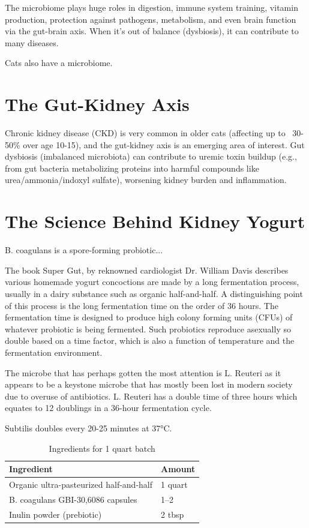 \documentclass[twocolumn]{NobArticle}
\begin{document}
	The microbiome plays huge roles in digestion, immune system training, vitamin production, protection against pathogens, metabolism, and even brain function via the gut-brain axis. When it's out of balance (dysbiosis), it can contribute to many diseases.
	
	Cats also have a microbiome.
	
	\section{The Gut-Kidney Axis}
	Chronic kidney disease (CKD) is very common in older cats (affecting up to ~30-50\% over age 10-15), and the gut-kidney axis is an emerging area of interest. Gut dysbiosis (imbalanced microbiota) can contribute to uremic toxin buildup (e.g., from gut bacteria metabolizing proteins into harmful compounds like urea/ammonia/indoxyl sulfate), worsening kidney burden and inflammation.
		
	
		
	\section{The Science Behind Kidney Yogurt}
	B. coagulans is a spore-forming probiotic...
	
	
	The book Super Gut, by reknowned cardiologist Dr. William Davis describes various homemade yogurt concoctions are made by a long fermentation process, usually in a dairy substance such as organic half-and-half. A distinguishing point of this process is the long fermentation time on the order of 36 hours. The fermentation time is designed to produce high colony forming units (CFUs) of whatever probiotic is being fermented. Such probiotics reproduce asexually so double based on a time factor, which is also a function of temperature and the fermentation environment.
	
	The microbe that has perhaps gotten the most attention is L. Reuteri as it appears to be a keystone microbe that has mostly been lost in modern society due to overuse of antibiotics. L. Reuteri has a double time of three hours which equates to 12 doublings in a 36-hour fermentation cycle.
	 
	Subtilis doubles every 20-25 minutes at 37°C. 
	
	\begin{table}[ht]
		\centering
		\begin{tabular}{ll}
			\toprule
			\textbf{Ingredient} & \textbf{Amount} \\
			\midrule
			Organic ultra-pasteurized half-and-half & 1 quart \\
			B. coagulans GBI-30,6086 capsules & 1--2 \\
			Inulin powder (prebiotic) & 2 tbsp \\
			\bottomrule
		\end{tabular}
		\caption{Ingredients for 1 quart batch}
		\label{tab:recipe-ingredients}
	\end{table}
	
\end{document}
